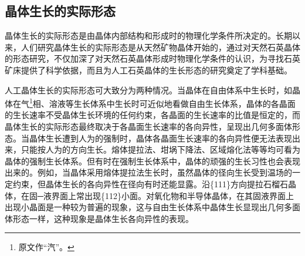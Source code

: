 \subsection{晶体生长的实际形态}
晶体生长的实际形态是由晶体内部结构和形成时的物理化学条件所决定的。长期以来，人们研究晶体生长的实际形态是从天然矿物晶体开始的，通过对天然石英晶体的形态研究，不仅加深了对天然石英晶体形成时物理化学条件的认识，为寻找石英矿床提供了科学依据，而且为人工石英晶体的生长形态的研究奠定了学科基础。

人工晶体生长的实际形态可大致分为两种情况。当晶体在自由体系中生长时，如晶体在气\footnote{原文作“汽”。}相、溶液等生长体系中生长时可近似地看做自由生长体系，晶体的各晶面的生长速率不受晶体生长环境的任何约束，各晶面的生长速率的比值是恒定的，而晶体生长的实际形态最终取决于各晶面生长速率的各向异性，呈现出几何多面体形态。当晶体生长遭到人为的强制时，晶体各晶面生长速率的各向异性便无法表现出来，只能按人为的方向生长。熔体提拉法、坩埚下降法、区域熔化法等等均可看为晶体的强制生长体系。但有时在强制生长体系中，晶体的顽强的生长习性也会表现出来的。例如，当晶体采用熔体提拉法生长时，虽然晶体的径向生长受到温场的一定约束，但晶体生长的各向异性在径向有时还能显露。沿\{111\}方向提拉石榴石晶体，在固─液界面上常出现\{112\}小面。对氧化物和半导体晶体，在其固液界面上出现小晶面是一种较为普遍的现象，这与自由生长体系中晶体生长显现出几何多面体形态一样，这种现象是晶体生长各向异性的表现。

